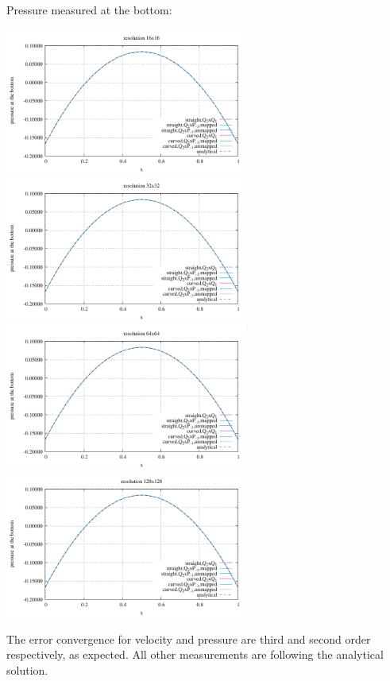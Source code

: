 \newpage
Pressure measured at the bottom:
\begin{center}
\includegraphics[width=8cm]{python_codes/fieldstone_25/results/doneahuerta/pbottom16.pdf}
\includegraphics[width=8cm]{python_codes/fieldstone_25/results/doneahuerta/pbottom32.pdf}\\
\includegraphics[width=8cm]{python_codes/fieldstone_25/results/doneahuerta/pbottom64.pdf}
\includegraphics[width=8cm]{python_codes/fieldstone_25/results/doneahuerta/pbottom128.pdf}
\end{center}

The error convergence for velocity and pressure are third and second order 
respectively, as expected. All other measurements are following the analytical solution.

